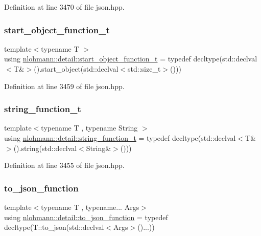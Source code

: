 Definition at line 3470 of file json.\+hpp.

\mbox{\label{namespacenlohmann_1_1detail_a5fff1e6dcaabd367d9b1109a5682f9d4}} 
\subsubsection{\texorpdfstring{start\_object\_function\_t}{start\_object\_function\_t}}
{\footnotesize\ttfamily template$<$typename T $>$ \\
using \mbox{\hyperlink{namespacenlohmann_1_1detail_a5fff1e6dcaabd367d9b1109a5682f9d4}{nlohmann\+::detail\+::start\+\_\+object\+\_\+function\+\_\+t}} = typedef decltype(std\+::declval$<$T\&$>$().start\+\_\+object(std\+::declval$<$std\+::size\+\_\+t$>$()))}



Definition at line 3459 of file json.\+hpp.

\mbox{\label{namespacenlohmann_1_1detail_a27c3fc3bd42ac406f763184aa8ae4cb0}} 
\subsubsection{\texorpdfstring{string\_function\_t}{string\_function\_t}}
{\footnotesize\ttfamily template$<$typename T , typename String $>$ \\
using \mbox{\hyperlink{namespacenlohmann_1_1detail_a27c3fc3bd42ac406f763184aa8ae4cb0}{nlohmann\+::detail\+::string\+\_\+function\+\_\+t}} = typedef decltype(std\+::declval$<$T\&$>$().string(std\+::declval$<$String\&$>$()))}



Definition at line 3455 of file json.\+hpp.

\mbox{\label{namespacenlohmann_1_1detail_af846b6cf2f926009ff3a7a61495ca383}} 
\subsubsection{\texorpdfstring{to\_json\_function}{to\_json\_function}}
{\footnotesize\ttfamily template$<$typename T , typename... Args$>$ \\
using \mbox{\hyperlink{namespacenlohmann_1_1detail_af846b6cf2f926009ff3a7a61495ca383}{nlohmann\+::detail\+::to\+\_\+json\+\_\+function}} = typedef decltype(T\+::to\+\_\+json(std\+::declval$<$Args$>$()...))}



